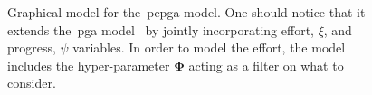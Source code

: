\begin{figure}[H]
\begin{tikzpicture}
  \end{tikzpicture}
  \caption{Graphical model for the~\gls{pepga} model. One should notice that it extends the~\gls{pga} model~\cite{smith_mining_2016} by jointly incorporating effort, $\xi$, and progress, $\psi$ variables. In order to model the effort, the model includes the hyper-parameter $\boldsymbol\Phi$ acting as a filter on what to consider. 
}
  \label{fig:graphical-model}
\end{figure}